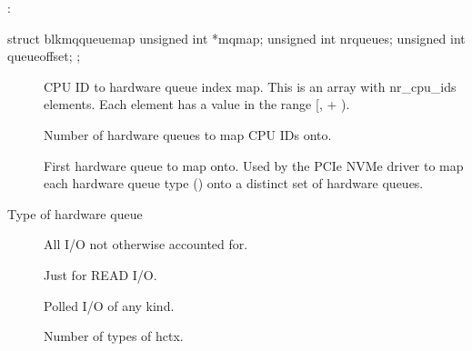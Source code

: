 \documentclass[a4paper,11pt,english]{sphinxmanual}
\begin{document}
:

\begin{sphinxVerbatim}[commandchars=\\\{\}]
struct blk\PYGZus{}mq\PYGZus{}queue\PYGZus{}map \PYGZob{}
    unsigned int *mq\PYGZus{}map;
    unsigned int nr\PYGZus{}queues;
    unsigned int queue\PYGZus{}offset;
\PYGZcb{};
\end{sphinxVerbatim}

\begin{description}
\item[{}] \leavevmode
CPU ID to hardware queue index map. This is an array
with nr\_cpu\_ids elements. Each element has a value in the range
{[},  + ).

\item[{}] \leavevmode
Number of hardware queues to map CPU IDs onto.

\item[{}] \leavevmode
First hardware queue to map onto. Used by the PCIe NVMe
driver to map each hardware queue type ({\hyperref[\detokenize{blk-mq:c.hctx_type}]{}}) onto a distinct
set of hardware queues.

\end{description}

\begin{fulllineitems}
\label{\detokenize{blk-mq:c.hctx_type}}
Type of hardware queue

\end{fulllineitems}


\begin{description}
\item[{}] \leavevmode
All I/O not otherwise accounted for.

\item[{}] \leavevmode
Just for READ I/O.

\item[{}] \leavevmode
Polled I/O of any kind.

\item[{}] \leavevmode
Number of types of hctx.

\end{description}
\end{document}
